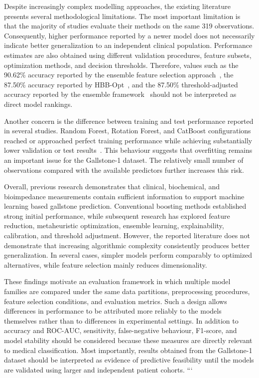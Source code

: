Despite increasingly complex modelling approaches, the existing literature presents several methodological limitations. The most important limitation is that the majority of studies evaluate their methods on the same 319 observations. Consequently, higher performance reported by a newer model does not necessarily indicate better generalization to an independent clinical population. Performance estimates are also obtained using different validation procedures, feature subsets, optimization methods, and decision thresholds. Therefore, values such as the 90.62\% accuracy reported by the ensemble feature selection approach~\cite{tamer2026novel}, the 87.50\% accuracy reported by HBB-Opt~\cite{rahman2026hbb}, and the 87.50\% threshold-adjusted accuracy reported by the ensemble framework~\cite{indirani2026ensemble} should not be interpreted as direct model rankings.

Another concern is the difference between training and test performance reported in several studies. Random Forest, Rotation Forest, and CatBoost configurations reached or approached perfect training performance while achieving substantially lower validation or test results~\cite{sarker2025gallstone,shrestha2026metaheuristic,das2026sloa}. This behaviour suggests that overfitting remains an important issue for the Gallstone-1 dataset. The relatively small number of observations compared with the available predictors further increases this risk.

Overall, previous research demonstrates that clinical, biochemical, and bioimpedance measurements contain sufficient information to support machine learning based gallstone prediction. Conventional boosting methods established strong initial performance, while subsequent research has explored feature reduction, metaheuristic optimization, ensemble learning, explainability, calibration, and threshold adjustment. However, the reported literature does not demonstrate that increasing algorithmic complexity consistently produces better generalization. In several cases, simpler models perform comparably to optimized alternatives, while feature selection mainly reduces dimensionality.

These findings motivate an evaluation framework in which multiple model families are compared under the same data partitions, preprocessing procedures, feature selection conditions, and evaluation metrics. Such a design allows differences in performance to be attributed more reliably to the models themselves rather than to differences in experimental settings. In addition to accuracy and ROC-AUC, sensitivity, false-negative behaviour, F1-score, and model stability should be considered because these measures are directly relevant to medical classification. Most importantly, results obtained from the Gallstone-1 dataset should be interpreted as evidence of predictive feasibility until the models are validated using larger and independent patient cohorts.
```